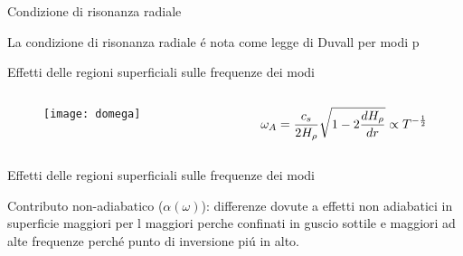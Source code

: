 \documentclass[10pt,xcolor={usenames},fleqn,mathserif,serif]{beamer}
\begin{document}
\begin{wordonframe}{Condizione di risonanza radiale}

La condizione di risonanza radiale \'e nota come legge di Duvall per modi p

\end{wordonframe}

\begin{frame}{Effetti delle regioni superficiali sulle frequenze dei modi}

\begin{columns}

\begin{column}{0.5\textwidth}

\begin{figure}
\texttt{[image: domega]}
\end{figure}

\end{column}

\begin{column}{0.5\textwidth}
%
\begin{align*}
&\omega_A=\frac{c_s}{2H_{\rho}{}}\sqrt{1-2\frac{d H_{\rho}{}}{d r}}\propto T^{-\frac{1}{2}}
\end{align*}


\end{column}

\end{columns}

\end{frame}

\begin{wordonframe}{Effetti delle regioni superficiali sulle frequenze dei modi}

Contributo non-adiabatico ($\alpha(\omega)$): differenze dovute a effetti non adiabatici in superficie maggiori per l maggiori perche confinati in guscio sottile e maggiori ad alte frequenze perch\'e punto di inversione pi\'u in alto.

\end{wordonframe}
\end{document}
